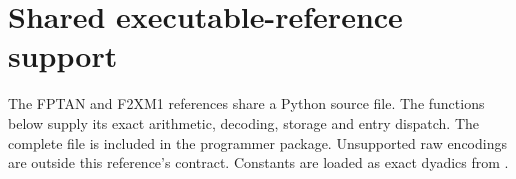 \documentclass[11pt]{article}
\begin{document}
{\renewcommand{\arraystretch}{0.94}

}

\clearpage
\section{Shared executable-reference support}
\label{app:common}

The FPTAN and F2XM1 references share a Python source file. The functions
below supply its exact arithmetic, decoding, storage and entry dispatch.
The complete file is included in the programmer package.
Unsupported raw encodings are outside this reference's contract.
Constants are loaded as exact dyadics from
.

\end{document}
